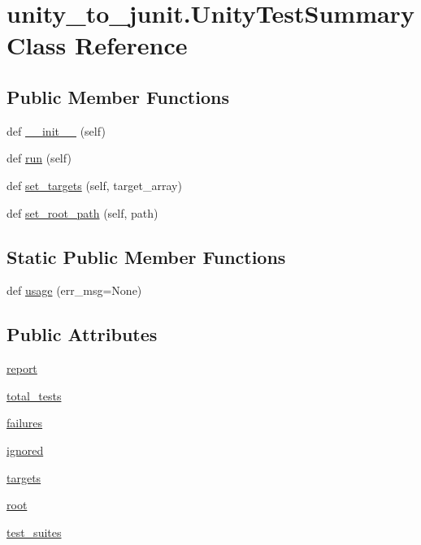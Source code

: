 \hypertarget{classunity__to__junit_1_1_unity_test_summary}{}\section{unity\+\_\+to\+\_\+junit.\+Unity\+Test\+Summary Class Reference}
\label{classunity__to__junit_1_1_unity_test_summary}
\subsection*{Public Member Functions}
\begin{DoxyCompactItemize}
\item 
def \hyperlink{classunity__to__junit_1_1_unity_test_summary_a9c7216043b32f182c07f48bd0e43b888}{\+\_\+\+\_\+init\+\_\+\+\_\+} (self)
\item 
def \hyperlink{classunity__to__junit_1_1_unity_test_summary_afdd46a63352b8ab9acaa8f64ec6c3797}{run} (self)
\item 
def \hyperlink{classunity__to__junit_1_1_unity_test_summary_aa7070ab538f01899a2188a62bdca09ee}{set\+\_\+targets} (self, target\+\_\+array)
\item 
def \hyperlink{classunity__to__junit_1_1_unity_test_summary_a1d9761b8e561dc10ce2997b30a497f68}{set\+\_\+root\+\_\+path} (self, path)
\end{DoxyCompactItemize}
\subsection*{Static Public Member Functions}
\begin{DoxyCompactItemize}
\item 
def \hyperlink{classunity__to__junit_1_1_unity_test_summary_a8af06f2da95b1ebb819e3c83e37f0700}{usage} (err\+\_\+msg=None)
\end{DoxyCompactItemize}
\subsection*{Public Attributes}
\begin{DoxyCompactItemize}
\item 
\hyperlink{classunity__to__junit_1_1_unity_test_summary_af238e0e3f19b3843e37d36980377ed24}{report}
\item 
\hyperlink{classunity__to__junit_1_1_unity_test_summary_a8af33e4fc6faed23b2a7035121a855e5}{total\+\_\+tests}
\item 
\hyperlink{classunity__to__junit_1_1_unity_test_summary_aa81410197141a91aeb663058c0c77fcb}{failures}
\item 
\hyperlink{classunity__to__junit_1_1_unity_test_summary_a2098fb414a6325f8caa816b6b7fe2f4d}{ignored}
\item 
\hyperlink{classunity__to__junit_1_1_unity_test_summary_a6d9d8a1b4a93d9ed2b0d9d86408f190c}{targets}
\item 
\hyperlink{classunity__to__junit_1_1_unity_test_summary_a4784068dcc7cfacf63c95bf8bde05a3e}{root}
\item 
\hyperlink{classunity__to__junit_1_1_unity_test_summary_ae73ffcabd682b592454f35c230de4bf1}{test\+\_\+suites}
\end{DoxyCompactItemize}


